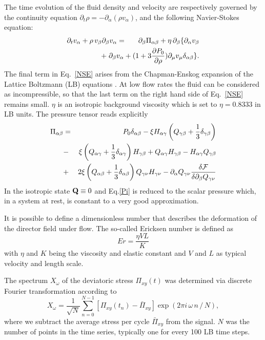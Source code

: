 \documentclass[aps,pre,reprint,superscriptaddress, twocolumn]{revtex4}
\begin{document}
The time evolution of the fluid density and velocity are respectively governed
by the continuity equation
$\partial_t \rho = -\partial_\alpha(\rho v_\alpha)$, and
the following Navier-Stokes equation:
\begin{eqnarray}
\partial_t v_\alpha +\rho \,v_\beta \partial_\beta v_\alpha
&=& \partial_\beta \Pi_{\alpha \beta}+ \eta\, \partial_\beta \{ \partial_\alpha v_\beta \nonumber\\
& &\hspace*{-1.5cm} +\; \partial_\beta v_\alpha
+(1+3\frac{\partial P_0}{\partial\rho} )\partial_\mu v_\mu \delta_{\alpha \beta}\}. 
\label{NSE}
\end{eqnarray}
The final term in Eq.~\ref{NSE} arises from the Chapman-Enskog expansion
of the Lattice Boltzmann (LB) equations \cite{Denniston:2001}.
At low flow rates the fluid can be considered as incompressible, so that the
last term on the right hand side of Eq.~\ref{NSE} remains small.
$\eta$ is an isotropic background viscosity which is set to $\eta=0.8333$ in LB units.
The pressure tensor reads explicitly
\begin{eqnarray}
\Pi_{\alpha \beta}&=&P_0 \delta_{\alpha\beta}
-\xi H_{\alpha \gamma}\left(Q_{\gamma \beta} +\frac{1}{3} \delta_{\gamma \beta}\right)\nonumber\\
&-&\xi \left(Q_{\alpha \gamma} +\frac{1}{3} \delta_{\alpha \gamma}\right) H_{\gamma \beta} + Q_{\alpha \gamma}H_{\gamma \beta}-H_{\alpha \gamma} Q_{\gamma \beta} \nonumber\\
&+&2 \xi  \left(Q_{\alpha \beta} +\frac{1}{3} \delta_{\alpha \beta}\right) Q_{\gamma \nu} H_{\gamma \nu}
- \partial_\alpha Q_{\gamma \nu} \frac{\delta{\cal F}}{\delta \partial_{\beta} Q_{\gamma \nu}}\nonumber\\
\label{Pi}
\end{eqnarray}
In the isotropic state ${\bf Q}\equiv 0$ and Eq.\ref{Pi} is reduced to the
scalar pressure which, in a system at rest, is constant to a very good
approximation.

It is possible to define a dimensionless number that describes the deformation
of the director field under flow. The so-called Ericksen number
is defined as 
\begin{equation}
Er=\frac{\eta V L}{K}
\end{equation}
with $\eta$ and $K$ being the viscosity and elastic constant and
$V$ and $L$ as typical velocity and length scale. 

The spectrum $X_\omega$ of the deviatoric stress $\Pi_{xy}(t)$ was determined via discrete Fourier transformation according to
\begin{equation}
X_\omega=\frac{1}{\sqrt{N}}\sum_{n=0}^{N-1} \left[\Pi_{xy}(t_n) - \bar{\Pi}_{xy}\right] \exp(2\pi i \, \omega \,n\,/\,N),
\label{spectrum}
\end{equation}
where we subtract the average stress per cycle $\bar{\Pi}_{xy}$ from the signal.
$N$ was the number of points in the time series, typically one for every 100 LB time steps. 
\end{document}
